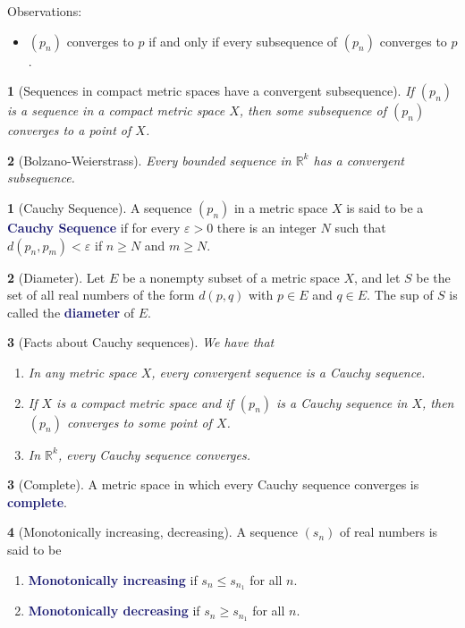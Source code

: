 \documentclass[11pt]{article}
\numberwithin{equation}{section}
\newcommand{\navy}[1]{\textcolor{MidnightBlue}{\bf #1}}
\theoremstyle{plain}
\newtheorem{theorem}{\color{ForestGreen}{\textbf{Theorem}}}[section]
\theoremstyle{definition}
\newtheorem{definition}{\color{MidnightBlue}{\textbf{Definition}}}[section]
\newcommand{\1}{\mathbbm 1}
\newcommand{\e}{\varepsilon}
\newcommand{\RR}{\mathbb R}
\begin{document}
Observations:
\begin{itemize}
	\item $(p_n)$ converges to $p$ if and only if every subsequence of $(p_n)$ converges to $p$. 
\end{itemize}

\begin{theorem}[Sequences in compact metric spaces have a convergent subsequence]
	If $(p_n)$ is a sequence in a compact metric space $X$, then some subsequence of $(p_n)$ converges to a point of $X$.
\end{theorem}

\begin{theorem}[Bolzano-Weierstrass]
	Every bounded sequence in $\RR^k$ has a convergent subsequence.
\end{theorem}

\begin{definition}[Cauchy Sequence]
	A sequence $(p_n)$ in a metric space $X$ is said to be a \navy{Cauchy Sequence} if for every $\e > 0$ there is an integer $N$ such that $d(p_n, p_m) < \e$ if $n \geq N$ and $m \geq N$.
\end{definition}

\begin{definition}[Diameter]
	Let $E$ be a nonempty subset of a metric space $X$, and let $S$ be the set of all real numbers of the form $d(p,q)$ with $p \in E$ and $q \in E$. The sup of $S$ is called the \navy{diameter} of $E$.
\end{definition}

\begin{theorem}[Facts about Cauchy sequences]
	We have that
\begin{enumerate}
	\item In any metric space $X$, every convergent sequence is a Cauchy sequence.
	\item If $X$ is a compact metric space and if $(p_n)$ is a Cauchy sequence in $X$, then $(p_n)$ converges to some point of $X$.
	\item In $\RR^k$, every Cauchy sequence converges. 
\end{enumerate}
\end{theorem}

\begin{definition}[Complete]
	A metric space in which every Cauchy sequence converges is \navy{complete}.
\end{definition}

\begin{definition}[Monotonically increasing, decreasing]
	A sequence $(s_n)$ of real numbers is said to be
	\begin{enumerate}
		\item \navy{Monotonically increasing} if $s_n \leq s_{n_1}$ for all $n$.
		\item \navy{Monotonically decreasing} if $s_n \geq s_{n_1}$ for all $n$.
	\end{enumerate}
\end{definition}
\end{document}
